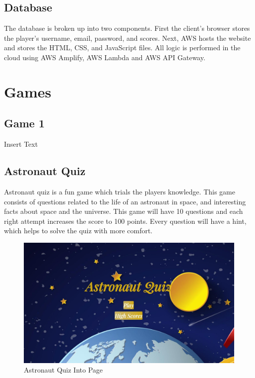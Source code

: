 \documentclass[12pt]{article}
\begin{document}
    \subsection{Database}
    The database is broken up into two components.  First the client's browser stores the player's username, email, password, and scores.  Next, AWS hosts the website and stores the HTML, CSS, and JavaScript files.  All logic is performed in the cloud using AWS Amplify, AWS Lambda and AWS API Gateway\cite{MozCS}\cite{AWS}.

\section{Games}
    \subsection{Game 1}

    Insert Text

    \newpage
    
    \subsection{Astronaut Quiz}

    Astronaut quiz is a fun game which trials the players knowledge.  This game consists of questions related to the life of an astronaut in space, and interesting facts about space and the universe. This game will have 10 questions and each right attempt increases the score to 100 points. Every question will have a hint, which helps to solve the quiz with more comfort.

    \begin{figure}[ht]
        \centering
            \includegraphics[height=0.3\textheight]{quizGameK1.jpg}
            \caption{Astronaut Quiz Into Page}
    \end{figure}
\end{document}
